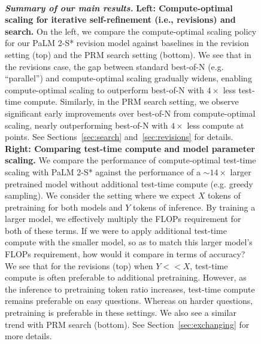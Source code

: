\begin{figure}[t]
    \centering
     \\
    \vspace{-0.2cm}
    \caption{\scriptsize{\textbf{\emph{Summary of our main results.}} \textbf{Left: Compute-optimal scaling for iterative self-refinement (i.e., revisions) and search.} On the left, we compare the compute-optimal scaling policy for our PaLM 2-S* revision model against baselines in the revision setting (top) and the PRM search setting (bottom). We see that in the revisions case, the gap between standard best-of-N (e.g. ``parallel'') and compute-optimal scaling gradually widens, enabling compute-optimal scaling to outperform best-of-N with $4\times$ less test-time compute. Similarly, in the PRM search setting, we observe significant early improvements over best-of-N from compute-optimal scaling, nearly outperforming best-of-N with $4\times$ less compute at points. See Sections~\ref{sec:search} and~\ref{sec:revisions} for details. \textbf{Right: Comparing test-time compute and model parameter scaling.} We compare the performance of compute-optimal test-time scaling with PaLM 2-S* against the performance of a $\sim14\times$ larger pretrained model without additional test-time compute (e.g. greedy sampling). We consider the setting where we expect $X$ tokens of pretraining for both models and $Y$ tokens of inference. By training a larger model, we effectively multiply the FLOPs requirement for both of these terms. If we were to apply additional test-time compute with the smaller model, so as to match this larger model's FLOPs requirement, how would it compare in terms of accuracy? We see that for the revisions (top) when $Y << X$, test-time compute is often preferable to additional pretraining. However, as the inference to pretraining token ratio increases, test-time compute remains preferable on easy questions. Whereas on harder questions, pretraining is preferable in these settings. We also see a similar trend with PRM search (bottom). See Section~\ref{sec:exchanging} for more details.}}
    \vspace{-0.2cm}
    \label{fig:comparing_base_lms}
\end{figure}

